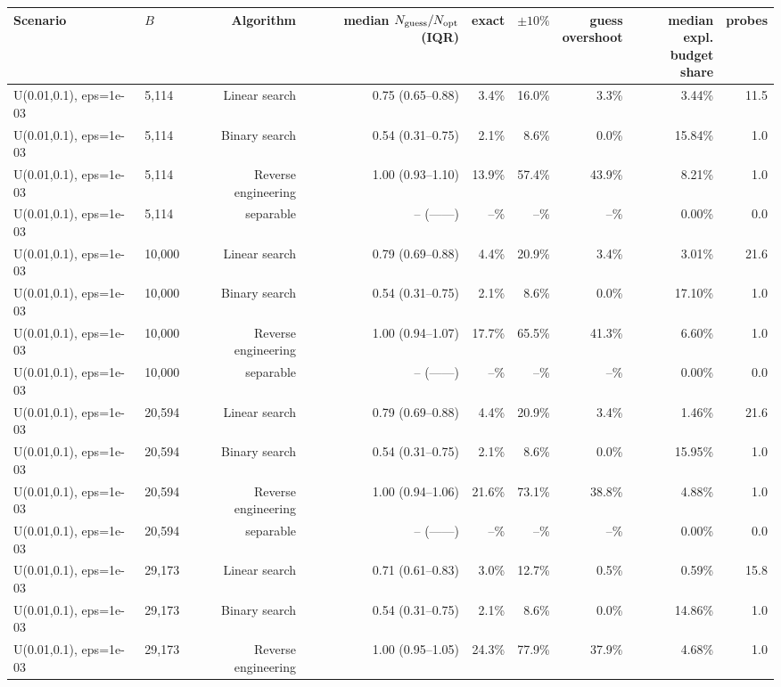\begin{tabular}{llrrrrrrr}
\toprule
Scenario & $B$ & Algorithm & \makecell{median\\$N_{\rm guess}/N_{\rm opt}$ (IQR)} & exact & $\pm10\%$ & \makecell{guess\\overshoot} & \makecell{median expl.\\budget share} & probes \\
\midrule
U(0.01,0.1), eps=1e-03 & 5,114 & Linear search & 0.75 (0.65--0.88) & 3.4\% & 16.0\% & 3.3\% & 3.44\% & 11.5 \\
U(0.01,0.1), eps=1e-03 & 5,114 & Binary search & 0.54 (0.31--0.75) & 2.1\% & 8.6\% & 0.0\% & 15.84\% & 1.0 \\
U(0.01,0.1), eps=1e-03 & 5,114 & Reverse engineering & 1.00 (0.93--1.10) & 13.9\% & 57.4\% & 43.9\% & 8.21\% & 1.0 \\
U(0.01,0.1), eps=1e-03 & 5,114 & separable & -- (------) & --\% & --\% & --\% & 0.00\% & 0.0 \\
U(0.01,0.1), eps=1e-03 & 10,000 & Linear search & 0.79 (0.69--0.88) & 4.4\% & 20.9\% & 3.4\% & 3.01\% & 21.6 \\
U(0.01,0.1), eps=1e-03 & 10,000 & Binary search & 0.54 (0.31--0.75) & 2.1\% & 8.6\% & 0.0\% & 17.10\% & 1.0 \\
U(0.01,0.1), eps=1e-03 & 10,000 & Reverse engineering & 1.00 (0.94--1.07) & 17.7\% & 65.5\% & 41.3\% & 6.60\% & 1.0 \\
U(0.01,0.1), eps=1e-03 & 10,000 & separable & -- (------) & --\% & --\% & --\% & 0.00\% & 0.0 \\
U(0.01,0.1), eps=1e-03 & 20,594 & Linear search & 0.79 (0.69--0.88) & 4.4\% & 20.9\% & 3.4\% & 1.46\% & 21.6 \\
U(0.01,0.1), eps=1e-03 & 20,594 & Binary search & 0.54 (0.31--0.75) & 2.1\% & 8.6\% & 0.0\% & 15.95\% & 1.0 \\
U(0.01,0.1), eps=1e-03 & 20,594 & Reverse engineering & 1.00 (0.94--1.06) & 21.6\% & 73.1\% & 38.8\% & 4.88\% & 1.0 \\
U(0.01,0.1), eps=1e-03 & 20,594 & separable & -- (------) & --\% & --\% & --\% & 0.00\% & 0.0 \\
U(0.01,0.1), eps=1e-03 & 29,173 & Linear search & 0.71 (0.61--0.83) & 3.0\% & 12.7\% & 0.5\% & 0.59\% & 15.8 \\
U(0.01,0.1), eps=1e-03 & 29,173 & Binary search & 0.54 (0.31--0.75) & 2.1\% & 8.6\% & 0.0\% & 14.86\% & 1.0 \\
U(0.01,0.1), eps=1e-03 & 29,173 & Reverse engineering & 1.00 (0.95--1.05) & 24.3\% & 77.9\% & 37.9\% & 4.68\% & 1.0 \\

\end{tabular}
